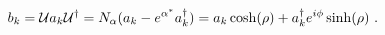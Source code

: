 \begin{equation}
  \label{eq:bog1}
  b_k = {\cal U}a_k {\cal U}^\dagger=N_\alpha(a_k - e^{\alpha^*} 
a_k^\dagger)
  = a_k \cosh (\rho) +  a_k^\dagger e^{i\phi}\sinh (\rho)~.
\end{equation}

